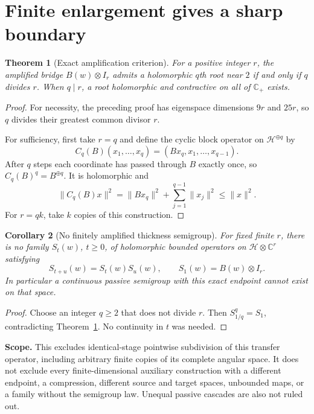 \documentclass[11pt,letterpaper]{article}
\newtheorem{theorem}{Theorem}
\newtheorem{corollary}[theorem]{Corollary}
\newcommand{\HH}{\mathcal H}
\newcommand{\CP}{\mathbb C_+}
\begin{document}
\section{Finite enlargement gives a sharp boundary}
\begin{theorem}[Exact amplification criterion]\label{thm:amp}
For a positive integer $r$, the amplified bridge $B(w)\otimes I_r$ admits a holomorphic $q$th root near $2$ if and only if $q$ divides $r$. When $q\mid r$, a root holomorphic and contractive on all of $\CP$ exists.
\end{theorem}
\begin{proof}
For necessity, the preceding proof has eigenspace dimensions $9r$ and $25r$, so $q$ divides their greatest common divisor $r$.

For sufficiency, first take $r=q$ and define the cyclic block operator on $\HH^{\oplus q}$ by
\begin{equation}\label{eq:companion}
 C_q(B)(x_1,\ldots,x_q)=(Bx_q,x_1,\ldots,x_{q-1}).
\end{equation}
After $q$ steps each coordinate has passed through $B$ exactly once, so $C_q(B)^q=B^{\oplus q}$. It is holomorphic and
\[
 \|C_q(B)x\|^2=\|Bx_q\|^2+\sum_{j=1}^{q-1}\|x_j\|^2\leq\|x\|^2.
\]
For $r=qk$, take $k$ copies of this construction.
\end{proof}

\begin{corollary}[No finitely amplified thickness semigroup]
For fixed finite $r$, there is no family $S_t(w)$, $t\geq0$, of holomorphic bounded operators on $\HH\otimes\mathbb C^r$ satisfying
\[
 S_{t+u}(w)=S_t(w)S_u(w),\qquad S_1(w)=B(w)\otimes I_r.
\]
In particular a continuous passive semigroup with this exact endpoint cannot exist on that space.
\end{corollary}
\begin{proof}
Choose an integer $q\geq2$ that does not divide $r$. Then $S_{1/q}^q=S_1$, contradicting Theorem~\ref{thm:amp}. No continuity in $t$ was needed.
\end{proof}

\textbf{Scope.} This excludes identical-stage pointwise subdivision of this transfer operator, including arbitrary finite copies of its complete angular space. It does not exclude every finite-dimensional auxiliary construction with a different endpoint, a compression, different source and target spaces, unbounded maps, or a family without the semigroup law. Unequal passive cascades are also not ruled out.
\end{document}
